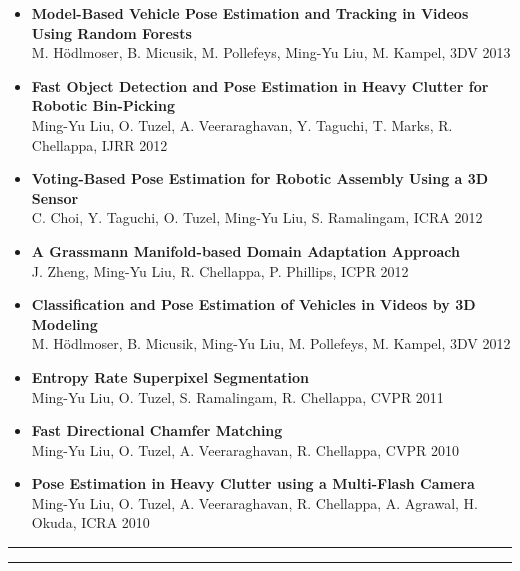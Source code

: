 \documentclass[10pt,letterpaper]{article}
\begin{document}
\begin{itemize}
      {Ming-Yu Liu}, O. Tuzel, S. Ramalingam, R. Chellappa, {TPAMI} 2014\vspace{-2mm}
\item {\bf Model-Based Vehicle Pose Estimation and Tracking in Videos Using Random Forests}\\
      M. Hödlmoser, B. Micusik, M. Pollefeys, {Ming-Yu Liu}, M. Kampel, {3DV} 2013\vspace{-2mm}
\item {\bf Fast Object Detection and Pose Estimation in Heavy Clutter for Robotic Bin-Picking}\\      
			{Ming-Yu Liu}, O. Tuzel, A. Veeraraghavan, Y. Taguchi, T. Marks, R. Chellappa, {IJRR} 2012\vspace{-2mm}
\item {\bf Voting-Based Pose Estimation for Robotic Assembly Using a 3D Sensor}\\
      C. Choi, Y. Taguchi, O. Tuzel, {Ming-Yu Liu}, S. Ramalingam, {ICRA} 2012\vspace{-2mm}
\item {\bf A Grassmann Manifold-based Domain Adaptation Approach}\\
			J. Zheng, {Ming-Yu Liu}, R. Chellappa, P. Phillips, {ICPR} 2012\vspace{-2mm}
\item {\bf Classification and Pose Estimation of Vehicles in Videos by 3D Modeling}\\%
      M. Hödlmoser, B. Micusik, {Ming-Yu Liu}, M. Pollefeys, M. Kampel, {3DV} 2012\vspace{-2mm}
\item {\bf Entropy Rate Superpixel Segmentation}\\                
			{Ming-Yu Liu}, O. Tuzel, S. Ramalingam, R. Chellappa, CVPR 2011\vspace{-2mm}
\item {\bf Fast Directional Chamfer Matching}\\                
			{Ming-Yu Liu}, O. Tuzel, A. Veeraraghavan, R. Chellappa, CVPR 2010\vspace{-2mm}
\item {\bf Pose Estimation in Heavy Clutter using a Multi-Flash Camera}\\
      {Ming-Yu Liu}, O. Tuzel, A. Veeraraghavan, R. Chellappa, A. Agrawal, H. Okuda, ICRA 2010\vspace{-2mm}
\end{itemize}
\hrule
\clearpage
\hrule
\vspace{-0.4em}
\end{document}
